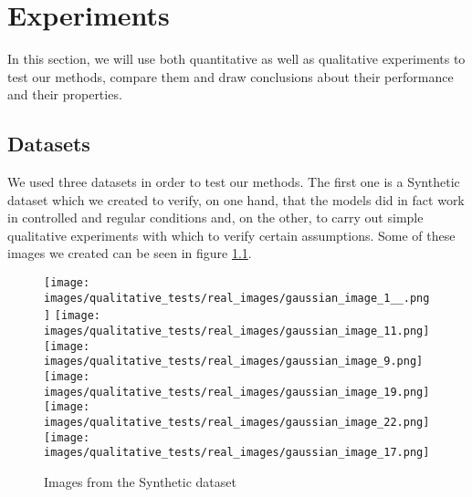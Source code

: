 \newpage
\chapter{Experiments}
\label{sec:experiments}

In this section, we will use both quantitative as well as qualitative experiments to test our methods, compare them and draw conclusions about their performance and their properties. 

\section{Datasets}
\label{subsec:dataset}
\noindent
We used three datasets in order to test our methods. The first one is a Synthetic dataset which we created to verify, on one hand, that the models did in fact work in controlled and regular conditions and, on the other, to carry out simple qualitative experiments with which to verify certain assumptions. Some of these images we created can be seen in figure \ref{fig:database_synthetic}.

\begin{figure}[h!]
	\centering
	\texttt{[image: images/qualitative\_tests/real\_images/gaussian\_image\_1\_\_.png]}\hspace{0.025\textwidth}%
	\texttt{[image: images/qualitative\_tests/real\_images/gaussian\_image\_11.png]}\hspace{0.025\textwidth}%
	\texttt{[image: images/qualitative\_tests/real\_images/gaussian\_image\_9.png]}\\[0.2em]
	
	\texttt{[image: images/qualitative\_tests/real\_images/gaussian\_image\_19.png]}\hspace{0.025\textwidth}%
	\texttt{[image: images/qualitative\_tests/real\_images/gaussian\_image\_22.png]}\hspace{0.025\textwidth}%
	\texttt{[image: images/qualitative\_tests/real\_images/gaussian\_image\_17.png]}\\[0.2em]
	\caption{Images from the Synthetic dataset}
	\label{fig:database_synthetic}
\end{figure}




